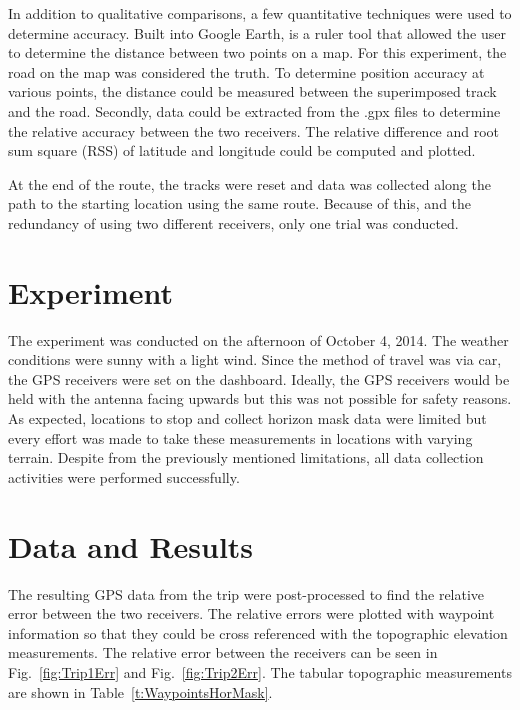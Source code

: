 \documentclass[]{aiaa-tc}%
\begin{document}
	\vspace{5 mm}
	
	\noindent In addition to qualitative comparisons, a few quantitative techniques were used to determine accuracy. Built into Google Earth, is a ruler tool that allowed the user to determine the distance between two points on a map. For this experiment, the road on the map was considered the truth. To determine position accuracy at various points, the distance could be measured between the superimposed track and the road. Secondly, data could be extracted from the .gpx files to determine the relative accuracy between the two receivers. The relative difference and root sum square (RSS) of latitude and longitude could be computed and plotted. 
	
	\vspace{5 mm}
	
	\noindent At the end of the route, the tracks were reset and data was collected along the path to the starting location using the same route. Because of this, and the redundancy of using two different receivers, only one trial was conducted. 
	
	\section{Experiment}
	
	\vspace{5 mm}
	
	\noindent The experiment was conducted on the afternoon of October 4, 2014. The weather conditions were sunny with a light wind. Since the method of travel was via car, the GPS receivers were set on the dashboard. Ideally, the GPS receivers would be held with the antenna facing upwards but this was not possible for safety reasons. As expected, locations to stop and collect horizon mask data were limited but every effort was made to take these measurements in locations with varying terrain. Despite from the previously mentioned limitations, all data collection activities were performed successfully.
	
	\section{Data and Results}
	
	\noindent The resulting GPS data from the trip were post-processed to find the relative error between the two receivers. The relative errors were plotted with waypoint information so that they could be cross referenced with the topographic elevation measurements. The relative error between the receivers can be seen in Fig.~\ref{fig:Trip1Err} and Fig.~\ref{fig:Trip2Err}. The tabular topographic measurements are shown in Table~\ref{t:WaypointsHorMask}. 
	
\end{document}
